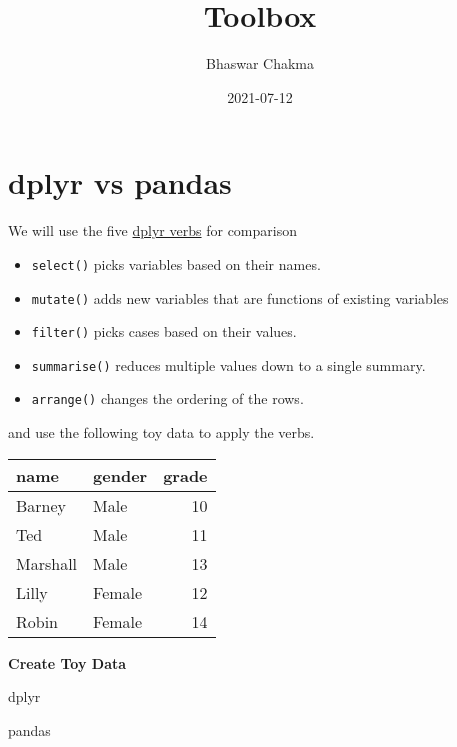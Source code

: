 \documentclass[
]{book}
\title{Toolbox}
\author{Bhaswar Chakma}
\date{2021-07-12}
\begin{document}
\maketitle

{
\setcounter{tocdepth}{1}
\tableofcontents
}
\hypertarget{section}{%
\chapter*{}\label{section}}

\hypertarget{dplyr-vs-pandas}{%
\chapter{dplyr vs pandas}\label{dplyr-vs-pandas}}

We will use the five \href{https://dplyr.tidyverse.org/}{dplyr verbs} for comparison

\begin{itemize}
\item
  \texttt{select()} picks variables based on their names.
\item
  \texttt{mutate()} adds new variables that are functions of existing variables
\item
  \texttt{filter()} picks cases based on their values.
\item
  \texttt{summarise()} reduces multiple values down to a single summary.
\item
  \texttt{arrange()} changes the ordering of the rows.
\end{itemize}

and use the following toy data to apply the verbs.

\begin{tabular}{l|l|r}
\hline
name & gender & grade\\
\hline
Barney & Male & 10\\
\hline
Ted & Male & 11\\
\hline
Marshall & Male & 13\\
\hline
Lilly & Female & 12\\
\hline
Robin & Female & 14\\
\hline
\end{tabular}

{\textbf{Create Toy Data}}

dplyr

pandas
\end{document}
